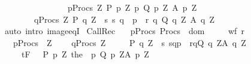 \begin{isabellebody}
\ \ \ \ \ \ \ \ \ \ \ \ \ \ \ \ {\isacharparenleft}{\isasymUnion}p{\isasymin}Procs{\isachardot}\ {\isasymUnion}Z{\isachardot}\ {\isacharbraceleft}{\isacharparenleft}P\ p\ Z{\isacharcomma}\ p{\isacharcomma}\ Q\ p\ Z{\isacharcomma}\ A\ p\ Z{\isacharparenright}{\isacharbraceright}{\isacharparenright}\ {\isacharequal}\ \isanewline
\ \ \ \ \ \ \ \ {\isacharparenleft}{\isasymUnion}q{\isasymin}Procs{\isachardot}\ {\isasymUnion}Z{\isachardot}\ {\isacharbraceleft}{\isacharparenleft}P\ q\ Z\ {\isasyminter}\ {\isacharbraceleft}s{\isachardot}\ {\isacharparenleft}{\isacharparenleft}s{\isacharcomma}\ q{\isacharparenright}{\isacharcomma}\ {\isasymtau}{\isacharcomma}\ p{\isacharparenright}\ {\isasymin}\ r{\isacharbraceright}{\isacharcomma}\ q{\isacharcomma}\ Q\ q\ Z{\isacharcomma}\ A\ q\ Z{\isacharparenright}{\isacharbraceright}{\isacharparenright}{\isachardoublequoteclose}\isanewline
%
\isadelimproof
\ \ %
\endisadelimproof
%
\isatagproof
{}\isamarkupfalse%
\ {\isacharparenleft}auto\ intro{\isacharbang}{\isacharcolon}\ image{\isacharunderscore}eqI{\isacharparenright}%
\endisatagproof
{\isafoldproof}%
%
\isadelimproof
\isanewline
%
\endisadelimproof
\isanewline
{}\isamarkupfalse%
\ CallRec{\isacharprime}{\isacharcolon}\ \isanewline
\ \ {\isachardoublequoteopen}{\isasymlbrakk}p{\isasymin}Procs{\isacharsemicolon}\ Procs\ {\isasymsubseteq}\ dom\ {\isasymGamma}{\isacharsemicolon}\isanewline
\ \ \ \ wf\ r{\isacharsemicolon}\ \isanewline
\ \ \ {\isasymforall}p{\isasymin}Procs{\isachardot}\ {\isasymforall}{\isasymtau}\ Z{\isachardot}\ \isanewline
\ \ \ {\isasymGamma}{\isacharcomma}{\isasymTheta}{\isasymunion}{\isacharparenleft}{\isasymUnion}q{\isasymin}Procs{\isachardot}\ {\isasymUnion}Z{\isachardot}\ \isanewline
\ \ \ \ {\isacharbraceleft}{\isacharparenleft}{\isacharparenleft}P\ q\ Z{\isacharparenright}\ {\isasyminter}\ {\isacharbraceleft}s{\isachardot}\ {\isacharparenleft}{\isacharparenleft}s{\isacharcomma}q{\isacharparenright}{\isacharcomma}{\isacharparenleft}{\isasymtau}{\isacharcomma}p{\isacharparenright}{\isacharparenright}\ {\isasymin}\ r{\isacharbraceright}{\isacharcomma}q{\isacharcomma}Q\ q\ Z{\isacharcomma}{\isacharparenleft}A\ q\ Z{\isacharparenright}{\isacharparenright}{\isacharbraceright}{\isacharparenright}\isanewline
\ \ \ \ \ {\isasymturnstile}\isactrlsub t\isactrlbsub {\isacharslash}F\isactrlesub \ {\isacharparenleft}{\isacharbraceleft}{\isasymtau}{\isacharbraceright}\ {\isasyminter}\ {\isacharparenleft}P\ p\ Z{\isacharparenright}{\isacharparenright}\ {\isacharparenleft}the\ {\isacharparenleft}{\isasymGamma}\ p{\isacharparenright}{\isacharparenright}\ {\isacharparenleft}Q\ p\ Z{\isacharparenright}{\isacharcomma}{\isacharparenleft}A\ p\ Z{\isacharparenright}{\isasymrbrakk}\isanewline

\end{isabellebody}
